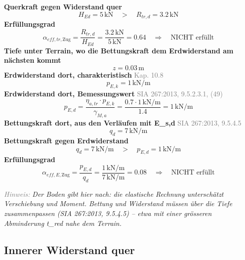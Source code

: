 \documentclass[11pt,a4paper]{article}
\newcommand{\normref}[1]{{\small\textcolor{gray}{#1}}}
\newcommand{\hinweis}[2]{\par\noindent\textcolor{gray}{\textit{#1:}} \textit{#2}\par}
\begin{document}
\noindent\textbf{Querkraft gegen Widerstand quer}
\begin{equation*}
H_{Ed} = 5\,\mathrm{kN} \quad > \quad R_{tr,d} = 3.2\,\mathrm{kN}
\end{equation*}
\noindent\textbf{Erfüllungsgrad}
\begin{equation*}
\alpha_{eff,tr,\text{Zug}} = \frac{R_{tr,d}}{H_{Ed}} = \frac{3.2\,\mathrm{kN}}{5\,\mathrm{kN}} = 0.64 \quad \Rightarrow \quad \text{NICHT erfüllt}
\end{equation*}
\noindent\textbf{Tiefe unter Terrain, wo die Bettungskraft dem Erdwiderstand am nächsten kommt}
\begin{equation*}
z = 0.03\,\mathrm{m}
\end{equation*}
\noindent\textbf{Erdwiderstand dort, charakteristisch} \hfill \normref{Kap. 10.8}
\begin{equation*}
p_{E,k} = 1\,\mathrm{kN}/\mathrm{m}
\end{equation*}
\noindent\textbf{Erdwiderstand dort, Bemessungswert} \hfill \normref{SIA 267:2013, 9.5.2.3.1, (49)}
\begin{equation*}
p_{E,d} = \frac{\eta_{a,tr} \cdot p_{E,k}}{\gamma_{M,a}} = \frac{0.7 \cdot 1\,\mathrm{kN}/\mathrm{m}}{1.4} = 1\,\mathrm{kN}/\mathrm{m}
\end{equation*}
\noindent\textbf{Bettungskraft dort, aus den Verläufen mit E\_s,d} \hfill \normref{SIA 267:2013, 9.5.4.5}
\begin{equation*}
q_d = 7\,\mathrm{kN}/\mathrm{m}
\end{equation*}
\noindent\textbf{Bettungskraft gegen Erdwiderstand}
\begin{equation*}
q_d = 7\,\mathrm{kN}/\mathrm{m} \quad > \quad p_{E,d} = 1\,\mathrm{kN}/\mathrm{m}
\end{equation*}
\noindent\textbf{Erfüllungsgrad}
\begin{equation*}
\alpha_{eff,E,\text{Zug}} = \frac{p_{E,d}}{q_d} = \frac{1\,\mathrm{kN}/\mathrm{m}}{7\,\mathrm{kN}/\mathrm{m}} = 0.08 \quad \Rightarrow \quad \text{NICHT erfüllt}
\end{equation*}
\hinweis{Hinweis}{Der Boden gibt hier nach: die elastische Rechnung unterschätzt Verschiebung und Moment. Bettung und Widerstand müssen über die Tiefe zusammenpassen (SIA 267:2013, 9.5.4.5) -- etwa mit einer grösseren Abminderung t\_red nahe dem Terrain.}
\subsection{Innerer Widerstand quer}
\end{document}
